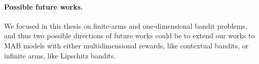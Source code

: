 \paragraph{Possible future works.}
%
We focused in this thesis on finite-arms and one-dimensional bandit problems,
and thus two possible directions of future works could be to extend our works
to MAB models with either multidimensional rewards, like contextual bandits, or infinite arms, like Lipschitz bandits.








